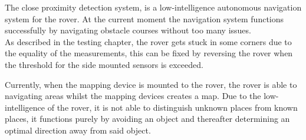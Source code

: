 The close proximity detection system, is a low-intelligence autonomous navigation system for the rover. At the current moment the navigation system functions successfully by navigating obstacle courses without too many issues.\\
As described in the testing chapter, the rover gets stuck in some corners due to the equality of the measurements, this can be fixed by reversing the rover when the threshold for the side mounted sensors is exceeded.


Currently, when the mapping device is mounted to the rover, the rover is able to navigating areas whilst the mapping devices creates a map. Due to the low-intelligence of the rover, it is not able to distinguish unknown places from known places, it functions purely by avoiding an object and thereafter determining an optimal direction away from said object.

